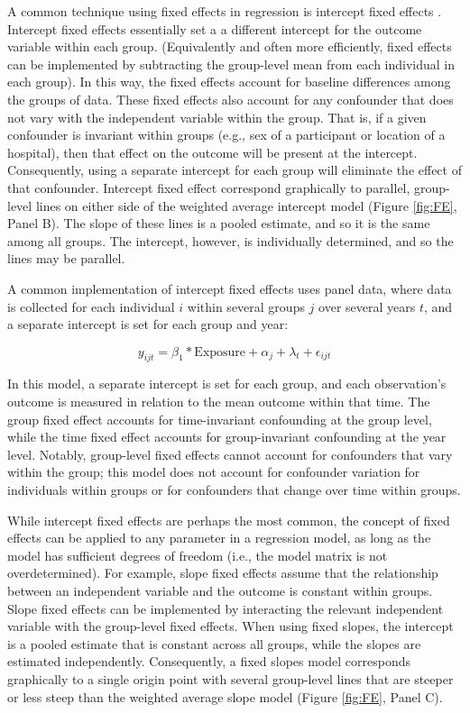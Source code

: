 \documentclass[12pt]{article}
\begin{document}
A common technique using fixed effects in regression is intercept fixed effects \citep{bellFixedRandomEffects2019}. Intercept fixed effects essentially set a a different intercept for the outcome variable within each group. (Equivalently and often more efficiently, fixed effects can be implemented by subtracting the group-level mean from each individual in each group). In this way, the fixed effects account for baseline differences among the groups of data. These fixed effects also account for any confounder that does not vary with the independent variable within the group. That is, if a given confounder is invariant within  groups (e.g., sex of a participant or location of a hospital), then that effect on the outcome will be present at the intercept. Consequently, using a separate intercept for each group will eliminate the effect of that confounder. Intercept fixed effect correspond graphically to parallel, group-level lines on either side of the weighted average intercept model (Figure \ref{fig:FE}, Panel B). The slope of these lines is a pooled estimate, and so it is the same among all groups. The intercept, however, is individually determined, and so the lines may be parallel.

A common implementation of intercept fixed effects uses panel data, where data is collected for each individual $i$ within several groups $j$ over several years $t$, and a separate intercept is set for each group and year:

\begin{equation}\label{eq:TwoWayFE}
  y_{ijt} = \beta_1*\textrm{Exposure} + \alpha_j + \lambda_t + \epsilon_{ijt}
\end{equation}

In this model, a separate intercept is set for each group, and each observation's outcome is measured in relation to the mean outcome within that time. The group fixed effect accounts for time-invariant confounding at the group level, while the time fixed effect accounts for group-invariant confounding at the year level. Notably, group-level fixed effects cannot account for confounders that vary within the group; this model does not account for confounder variation for individuals within groups or for confounders that change over time within groups.

While intercept fixed effects are perhaps the most common, the concept of fixed effects can be applied to any parameter in a regression model, as long as the model has sufficient degrees of freedom (i.e., the model matrix is not overdetermined). For example, slope fixed effects assume that the relationship between an independent variable and the outcome is constant within groups. Slope fixed effects can be implemented by interacting the relevant independent variable with the group-level fixed effects. When using fixed slopes, the intercept is a pooled estimate that is constant across all groups, while the slopes are estimated independently. Consequently, a fixed slopes model corresponds graphically to a single origin point with several group-level lines that are steeper or less steep than the weighted average slope model (Figure \ref{fig:FE}, Panel C).
\end{document}
